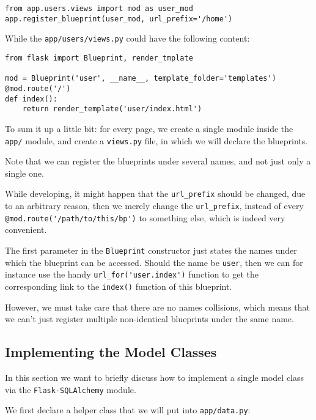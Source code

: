 \documentclass[../main/main.tex]{subfiles}
\begin{document}
\begin{lstlisting}
from app.users.views import mod as user_mod
app.register_blueprint(user_mod, url_prefix='/home')
\end{lstlisting}

While the \lstinline|app/users/views.py| could have the following
content:

\begin{lstlisting}
from flask import Blueprint, render_tmplate

mod = Blueprint('user', __name__, template_folder='templates')
@mod.route('/')
def index():
    return render_template('user/index.html')
\end{lstlisting}

To sum it up a little bit: for every page, we create a single module
inside the \lstinline|app/| module, and create a \lstinline|views.py|
file, in which we will declare the blueprints. 

Note that we can register the blueprints under several names, and not
just only a single one. 

While developing, it might happen that the \lstinline|url_prefix|
should be changed, due to an arbitrary reason, then we merely change
the \lstinline|url_prefix|, instead of every
\lstinline|@mod.route('/path/to/this/bp')| to something else, which is
indeed very convenient.

The first parameter in the \lstinline|Blueprint| constructor just
states the names under which the blueprint can be accessed. Should the
name be \lstinline|user|, then we can for instance use the handy
\lstinline|url_for('user.index')| function to get the corresponding
link to the \lstinline|index()| function of this blueprint. 

However, we must take care that there are no names collisions, which
means that we can't just register multiple non-identical blueprints
under the same name. 


\subsection{Implementing the Model Classes}

In this section we want to briefly discuss how to implement a single
model class via the \lstinline|Flask-SQLAlchemy| module. 

We first declare a helper class that we will put into
\lstinline|app/data.py|: 
\end{document}
